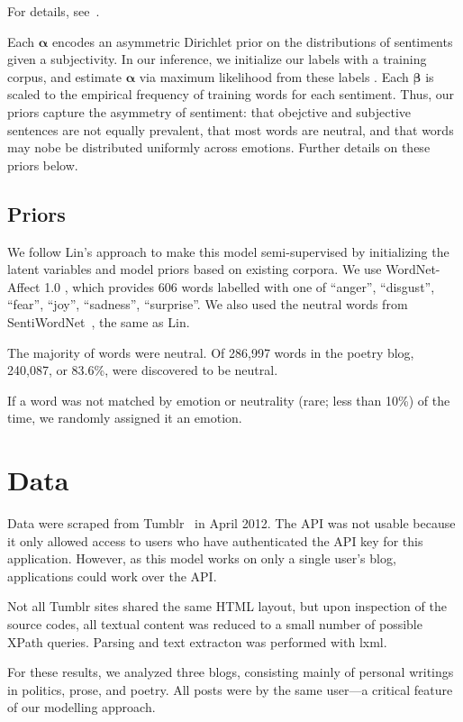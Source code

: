 \documentclass{article}
\begin{document}
For details, see~\citep{lin03}.

Each $\mathbf{\alpha}$ encodes an asymmetric Dirichlet prior on the
distributions of sentiments given a subjectivity. In our inference,
we initialize our labels with a training corpus, and estimate
$\mathbf{\alpha}$ via maximum likelihood from these labels
\citep{minka00}. Each $\mathbf{\beta}$ is scaled to the empirical
frequency of training words for each sentiment. Thus, our priors
capture the asymmetry of sentiment: that obejctive and subjective
sentences are not equally prevalent, that most words are neutral,
and that words may nobe be distributed uniformly across emotions.
Further details on these priors below.

\subsection{Priors}
We follow Lin's approach to make this model semi-supervised by
initializing the latent variables and model priors based on
existing corpora. We use WordNet-Affect 1.0 \citep{strapparava04},
which provides 606 words labelled with one of ``anger'', ``disgust'',
``fear'', ``joy'', ``sadness'', ``surprise''. We also used the
neutral words from SentiWordNet~\citep{baccianella10}, the same
as Lin.

The majority of words were neutral. Of 286,997 words in the 
poetry blog, 240,087, or 83.6\%, were discovered to be neutral.

If a word was not matched by emotion or neutrality (rare; less than
10\%) of the time, we randomly assigned it an emotion.

\section{Data}
Data were scraped from Tumblr~\citep{tumblr} in April 2012. The API
was not usable because it only allowed access to users who have
authenticated the API key for this application. However, as this
model works on only a single user's blog, applications could work
over the API.

Not all Tumblr sites shared the same HTML layout, but upon inspection
of the source codes, all textual content was reduced to a small
number of possible XPath queries. Parsing and text extracton was
performed with lxml.

For these results, we analyzed three blogs, consisting mainly of
personal writings in politics, prose, and poetry. All posts were
by the same user---a critical feature of our modelling approach.
\end{document}
